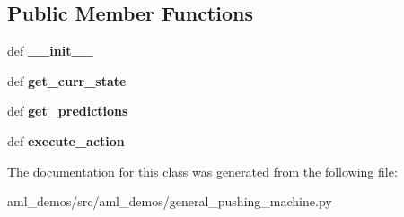 \subsection*{Public Member Functions}
\begin{DoxyCompactItemize}
\item 
\hypertarget{classaml__demos_1_1general__pushing__machine_1_1_general_pushing_machine_a63235fd0c38d5ad7150ac2ec890f9e57}{def {\bfseries \-\_\-\-\_\-init\-\_\-\-\_\-}}\label{classaml__demos_1_1general__pushing__machine_1_1_general_pushing_machine_a63235fd0c38d5ad7150ac2ec890f9e57}

\item 
\hypertarget{classaml__demos_1_1general__pushing__machine_1_1_general_pushing_machine_a96b92d69b04bbb0026809e5660ceee87}{def {\bfseries get\-\_\-curr\-\_\-state}}\label{classaml__demos_1_1general__pushing__machine_1_1_general_pushing_machine_a96b92d69b04bbb0026809e5660ceee87}

\item 
\hypertarget{classaml__demos_1_1general__pushing__machine_1_1_general_pushing_machine_ab4993104f6f8d367e11d523cb2314a67}{def {\bfseries get\-\_\-predictions}}\label{classaml__demos_1_1general__pushing__machine_1_1_general_pushing_machine_ab4993104f6f8d367e11d523cb2314a67}

\item 
\hypertarget{classaml__demos_1_1general__pushing__machine_1_1_general_pushing_machine_a7ea7edb4f400f5d86a25828bebba7bfd}{def {\bfseries execute\-\_\-action}}\label{classaml__demos_1_1general__pushing__machine_1_1_general_pushing_machine_a7ea7edb4f400f5d86a25828bebba7bfd}

\end{DoxyCompactItemize}


The documentation for this class was generated from the following file\-:\begin{DoxyCompactItemize}
\item 
aml\-\_\-demos/src/aml\-\_\-demos/general\-\_\-pushing\-\_\-machine.\-py\end{DoxyCompactItemize}
